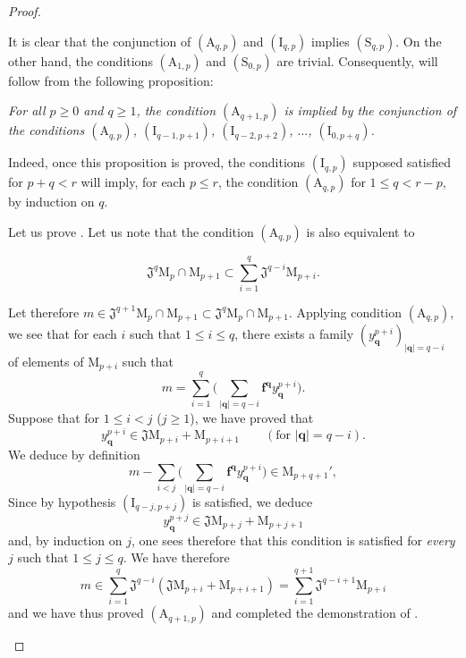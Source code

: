 \begin{proof}
\begin{env}[19.5.5.3]
It is clear that the conjunction of $(\mathrm{A}_{q,p})$ and $(\mathrm{I}_{q,p})$ implies $(\mathrm{S}_{q,p})$. On the other hand, the conditions $(\mathrm{A}_{1,p})$ and $(\mathrm{S}_{0,p})$ are trivial. Consequently,  will follow from the following proposition:
\end{env}

\begin{env}[19.5.5.4]
\label{IV.19.5.5.4}
\emph{For all $p\geqslant 0$ and $q\geqslant 1$, the condition $(\mathrm{A}_{q+1,p})$ is implied by the conjunction of the conditions $(\mathrm{A}_{q,p})$, $(\mathrm{I}_{q-1,p+1})$, $(\mathrm{I}_{q-2,p+2})$, $\ldots$, $(\mathrm{I}_{0,p+q})$.}

Indeed, once this proposition is proved, the conditions $(\mathrm{I}_{q,p})$ supposed satisfied for $p+q<r$ will imply, for each $p\leqslant r$, the condition $(\mathrm{A}_{q,p})$ for $1\leqslant q<r-p$, by induction on $q$.

Let us prove . Let us note that the condition $(\mathrm{A}_{q,p})$ is also equivalent to
\end{env}

\begin{env}[19.5.5.5]
\label{IV.19.5.5.5}
\[
  \mathfrak{J}^q\mathrm{M}_p\cap\mathrm{M}_{p+1}\subset\textstyle\sum_{i=1}^{q}\mathfrak{J}^{q-i}\mathrm{M}_{p+i}.
\]

Let therefore $m\in\mathfrak{J}^{q+1}\mathrm{M}_p\cap\mathrm{M}_{p+1}\subset\mathfrak{J}^q\mathrm{M}_p\cap\mathrm{M}_{p+1}$. Applying condition $(\mathrm{A}_{q,p})$, we see that for each $i$ such that $1\leqslant i\leqslant q$, there exists a family $(y_\mathbf{q}^{p+i})_{|\mathbf{q}|=q-i}$ of elements of $\mathrm{M}_{p+i}$ such that
\[
  m=\textstyle\sum_{i=1}^{q}\bigl(\textstyle\sum_{|\mathbf{q}|=q-i}\mathbf{f}^\mathbf{q} y_\mathbf{q}^{p+i}\bigr).
\]
Suppose that for $1\leqslant i<j$ ($j\geqslant 1$), we have proved that
\[
  y_\mathbf{q}^{p+i}\in\mathfrak{J}\mathrm{M}_{p+i}+\mathrm{M}_{p+i+1}\qquad(\text{for }|\mathbf{q}|=q-i).
\]
We deduce by definition 
\[
  m-\textstyle\sum_{i<j}\bigl(\textstyle\sum_{|\mathbf{q}|=q-i}\mathbf{f}^\mathbf{q} y_\mathbf{q}^{p+i}\bigr)\in\mathrm{M}_{p+q+1}',
\]
Since by hypothesis $(\mathrm{I}_{q-j,p+j})$ is satisfied, we deduce
\[
  y_\mathbf{q}^{p+j}\in\mathfrak{J}\mathrm{M}_{p+j}+\mathrm{M}_{p+j+1}
\]
and, by induction on $j$, one sees therefore that this condition is satisfied for \emph{every} $j$ such that $1\leqslant j\leqslant q$. We have therefore
\[
  m\in\textstyle\sum_{i=1}^{q}\mathfrak{J}^{q-i}(\mathfrak{J}\mathrm{M}_{p+i}+\mathrm{M}_{p+i+1})=\textstyle\sum_{i=1}^{q+1}\mathfrak{J}^{q-i+1}\mathrm{M}_{p+i}
\]
and we have thus proved $(\mathrm{A}_{q+1,p})$ and completed the demonstration of .
\end{env}
\end{proof}

